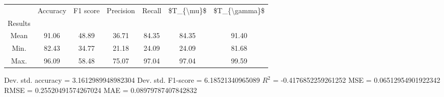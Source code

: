 \begin{tabular}{|c|c|c|c|c|c|c|}
\toprule
{} &  Accuracy &  F1 score &  Precision &  Recall &  \$T\_\{\textbackslash mu\}\$ &  \$T\_\{\textbackslash gamma\}\$ \\
Results &           &           &            &         &            &               \\
\hline
Mean    &     91.06 &     48.89 &      36.71 &   84.35 &      84.35 &         91.40 \\
Min.    &     82.43 &     34.77 &      21.18 &   24.09 &      24.09 &         81.68 \\
Max.    &     96.09 &     58.48 &      75.07 &   97.04 &      97.04 &         99.59 \\
\bottomrule
\end{tabular}

 Dev. std. accuracy = 3.1612989948982304
 Dev. std. F1-score = 6.18521340965089
 $R^2$ = -0.4176852259261252
 MSE = 0.06512954901922342
 RMSE = 0.25520491574267024
 MAE = 0.08979787407842832